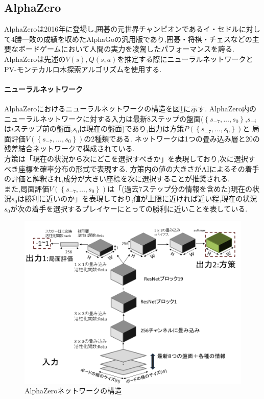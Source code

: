 \subsection{AlphaZero}
AlphaZeroは2016年に登場し,囲碁の元世界チャンピオンであるイ・セドルに対して4勝一敗の成績を収めたAlphaGoの汎用版であり,囲碁・将棋・チェスなどの主要なボードゲームにおいて人間の実力を凌駕したパフォーマンスを誇る.
AlphaZeroは先述の$V(s),Q(s, a)$を推定する際にニューラルネットワークとPV-モンテカルロ木探索アルゴリズムを使用する.
\paragraph{ニューラルネットワーク}
AlphaZeroにおけるニューラルネットワークの構造を図\ref{fig:network}に示す.
AlphaZero内のニューラルネットワークに対する入力は最新$8$ステップの盤面($\left\{ s_{-7}, ..., s_0 \right\}$,$s_{-i}$は$i$ステップ前の盤面,$s_{0}$は現在の盤面)であり,出力は方策$P(\left\{ s_{-7}, ..., s_0 \right\})$と
局面評価$V(\left\{ s_{-7}, ..., s_0 \right\})$の2種類である.
ネットワークは1つの畳み込み層と20の残差結合ネットワークで構成されている.  \\
方策は「現在の状況から次にどこを選択すべきか」を表現しており,次に選択すべき座標を確率分布の形式で表現する.
方策内の値の大きさがAIによるその着手の評価と解釈され,成分が大きい座標を次に選択することが推奨される.\\
また,局面評価$V(\left\{ s_{-7}, ..., s_0 \right\})$は「(過去7ステップ分の情報を含めた)現在の状況$s_0$は勝利に近いのか」を表現しており,値が上限に近ければ近い程,現在の状況$s_0$が次の着手を選択するプレイヤーにとっての勝利に近いことを表している.
\begin{figure}[t]
	\centering
	\includegraphics[width=\linewidth]{./figure/network.png}
	\caption{AlphaZeroネットワークの構造}
	\label{fig:network}
\end{figure}
